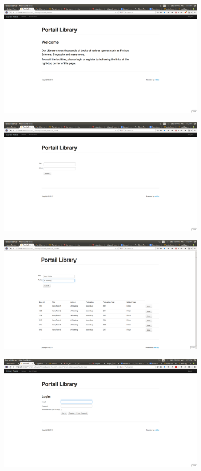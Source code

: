 \documentclass{article}
\begin{document}
\begin{figure}[ht!]
\centering
\includegraphics[width=100mm]{1.png}
\caption{}
\end{figure}
\begin{figure}[ht!]
\centering
\includegraphics[width=100mm]{2.png}
\caption{}
\end{figure}
\begin{figure}[ht!]
\centering
\includegraphics[width=100mm]{3.png}
\caption{}
\end{figure}
\begin{figure}[ht!]
\centering
\includegraphics[width=100mm]{4.png}
\caption{}
\end{figure}
\end{document}
